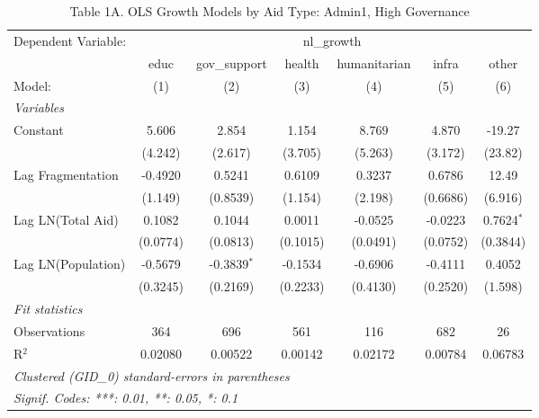 \begin{table}[htbp]
   \caption{Table 1A. OLS Growth Models by Aid Type: Admin1, High Governance}
   \centering
   \begin{tabular}{lcccccc}
      \tabularnewline \midrule \midrule
      Dependent Variable: & \multicolumn{6}{c}{nl\_growth}\\
                         & educ     & gov\_support  & health   & humanitarian & infra    & other \\   
      Model:             & (1)      & (2)           & (3)      & (4)          & (5)      & (6)\\  
      \midrule
      \emph{Variables}\\
      Constant           & 5.606    & 2.854         & 1.154    & 8.769        & 4.870    & -19.27\\   
                         & (4.242)  & (2.617)       & (3.705)  & (5.263)      & (3.172)  & (23.82)\\   
      Lag Fragmentation  & -0.4920  & 0.5241        & 0.6109   & 0.3237       & 0.6786   & 12.49\\   
                         & (1.149)  & (0.8539)      & (1.154)  & (2.198)      & (0.6686) & (6.916)\\   
      Lag LN(Total Aid)  & 0.1082   & 0.1044        & 0.0011   & -0.0525      & -0.0223  & 0.7624$^{*}$\\   
                         & (0.0774) & (0.0813)      & (0.1015) & (0.0491)     & (0.0752) & (0.3844)\\   
      Lag LN(Population) & -0.5679  & -0.3839$^{*}$ & -0.1534  & -0.6906      & -0.4111  & 0.4052\\   
                         & (0.3245) & (0.2169)      & (0.2233) & (0.4130)     & (0.2520) & (1.598)\\   
      \midrule
      \emph{Fit statistics}\\
      Observations       & 364      & 696           & 561      & 116          & 682      & 26\\  
      R$^2$              & 0.02080  & 0.00522       & 0.00142  & 0.02172      & 0.00784  & 0.06783\\  
      \midrule \midrule
      \multicolumn{7}{l}{\emph{Clustered (GID\_0) standard-errors in parentheses}}\\
      \multicolumn{7}{l}{\emph{Signif. Codes: ***: 0.01, **: 0.05, *: 0.1}}\\
   \end{tabular}
\end{table}



